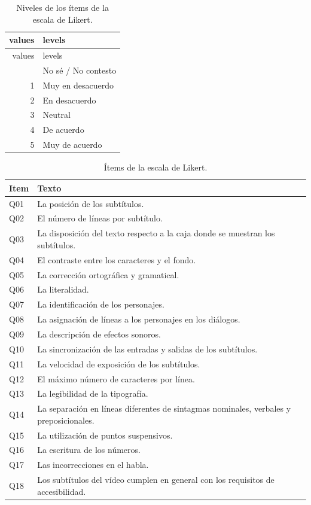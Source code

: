 \documentclass[
  12pt,
  a4paper,
  extrafontsizes,
  onecolumn,
  openright,
  table]{memoir}
\begin{document}
\hypertarget{tbl-likert-levels}{}
\begin{longtable}[]{@{}rl@{}}
\caption{\label{tbl-likert-levels}Niveles de los ítems de la escala de
Likert.}\tabularnewline
\toprule\noalign{}
values & levels \\
\midrule\noalign{}
\endfirsthead
\toprule\noalign{}
values & levels \\
\midrule\noalign{}
\endhead
\bottomrule\noalign{}
\endlastfoot
0 & No sé / No contesto \\
1 & Muy en desacuerdo \\
2 & En desacuerdo \\
3 & Neutral \\
4 & De acuerdo \\
5 & Muy de acuerdo \\
\end{longtable}

\hypertarget{tbl-likert-scale}{}
\begin{longtable}{ll}
\caption{\label{tbl-likert-scale}Ítems de la escala de Likert. }\tabularnewline

\toprule
Item & Texto \\ 
\midrule
Q01 & La posición de los subtítulos. \\ 
Q02 & El número de líneas por subtítulo. \\ 
Q03 & La disposición del texto respecto a la caja donde se muestran los subtítulos. \\ 
Q04 & El contraste entre los caracteres y el fondo. \\ 
Q05 & La corrección ortográfica y gramatical. \\ 
Q06 & La literalidad. \\ 
Q07 & La identificación de los personajes. \\ 
Q08 & La asignación de líneas a los personajes en los diálogos. \\ 
Q09 & La descripción de efectos sonoros. \\ 
Q10 & La sincronización de las entradas y salidas de los subtítulos. \\ 
Q11 & La velocidad de exposición de los subtítulos. \\ 
Q12 & El máximo número de caracteres por línea. \\ 
Q13 & La legibilidad de la tipografía. \\ 
Q14 & La separación en líneas diferentes de sintagmas nominales, verbales y preposicionales. \\ 
Q15 & La utilización de puntos suspensivos. \\ 
Q16 & La escritura de los números. \\ 
Q17 & Las incorrecciones en el habla. \\ 
Q18 & Los subtítulos del vídeo cumplen en general con los requisitos de accesibilidad. \\ 
\bottomrule
\end{longtable}
\end{document}
